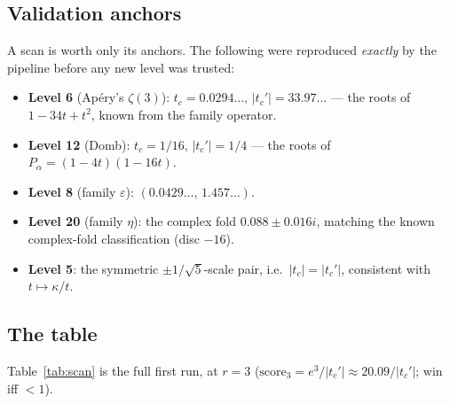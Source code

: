 \documentclass[11pt,reqno]{amsart}
\theoremstyle{plain}
\theoremstyle{definition}
\theoremstyle{remark}
\newcommand{\eps}{\varepsilon}
\newcommand{\tc}{t_c}
\newcommand{\tcp}{t_c'}
\begin{document}
\subsection{Validation anchors}

A scan is worth only its anchors. The following were reproduced
\emph{exactly} by the pipeline before any new level was trusted:

\begin{itemize}[leftmargin=1.4em]
\item \textbf{Level 6} (Ap\'ery's $\zeta(3)$): $\tc=0.0294\ldots$,
  $|\tcp|=33.97\ldots$ --- the roots of $1-34t+t^2$, known from the family
  operator.
\item \textbf{Level 12} (Domb): $\tc=1/16$, $|\tcp|=1/4$ --- the roots of
  $P_\alpha=(1-4t)(1-16t)$.
\item \textbf{Level 8} (family $\eps$): $(0.0429\ldots,\,1.457\ldots)$.
\item \textbf{Level 20} (family $\eta$): the complex fold
  $0.088\pm0.016i$, matching the known complex-fold classification (disc
  $-16$).
\item \textbf{Level 5}: the symmetric $\pm1/\sqrt5$-scale pair, i.e.\
  $|\tc|=|\tcp|$, consistent with $t\mapsto\kappa/t$.
\end{itemize}

\subsection{The table}

Table~\ref{tab:scan} is the full first run, at $r=3$
($\mathrm{score}_3=e^3/|\tcp|\approx 20.09/|\tcp|$; win iff $<1$).
\end{document}
